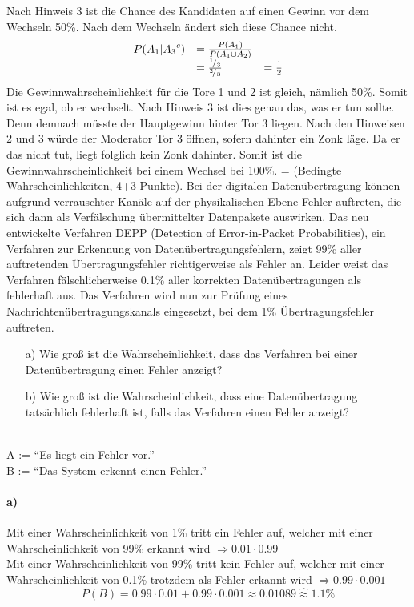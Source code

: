 \documentclass[twoside]{article}
\begin{document}
Nach Hinweis 3 ist die Chance des Kandidaten auf einen Gewinn vor dem Wechseln 50\%.
Nach dem Wechseln ändert sich diese Chance nicht.
\[
	\begin{array}{lll}
		P (A_1 | {A_3}^c)	&=	\frac{P(A_1)}{P(A_1\cup A_2)}	&\\
									&=	\frac{{}^{1}\!/_{3}}{{}^{2}\!/_{3}}	&= \frac{1}{2}
	\end{array}
\]
Die Gewinnwahrscheinlichkeit für die Tore 1 und 2 ist gleich, nämlich 50\%.
Somit ist es egal, ob er wechselt.
Nach Hinweis 3 ist dies genau das, was er tun sollte.
Denn demnach müsste der Hauptgewinn hinter Tor 3 liegen.
Nach den Hinweisen 2 und 3 würde der Moderator Tor 3 öffnen, sofern dahinter ein Zonk läge.
Da er das nicht tut, liegt folglich kein Zonk dahinter.
Somit ist die Gewinnwahrscheinlichkeit bei einem Wechsel bei 100\%.
\fi
\ifnum\ZettelAcht=\True
{}
\chead{}
\rhead{\memTwoName\\\memTwoNr}
(Bedingte Wahrscheinlichkeiten, 4+3 Punkte).
Bei der digitalen Datenübertragung können aufgrund verrauschter Kanäle auf der physikalischen Ebene Fehler auftreten, die sich dann als Verfälschung übermittelter Datenpakete auswirken.
Das neu entwickelte Verfahren DEPP (Detection of Error-in-Packet Probabilities), ein Verfahren zur Erkennung von
Datenübertragungsfehlern, zeigt 99\% aller auftretenden Übertragungsfehler richtigerweise als Fehler an.
Leider weist das Verfahren fälschlicherweise 0.1\% aller korrekten Datenübertragungen als fehlerhaft aus.
Das Verfahren wird nun zur Prüfung eines Nachrichtenübertragungskanals eingesetzt, bei dem 1\% Übertragungsfehler auftreten. 
\begin{enumerate}
	\item[a)] Wie groß ist die Wahrscheinlichkeit, dass das Verfahren bei einer Datenübertragung einen Fehler anzeigt?
	\item[b)] Wie groß ist die Wahrscheinlichkeit, dass eine Datenübertragung tatsächlich fehlerhaft ist, falls das Verfahren einen Fehler anzeigt?
\end{enumerate}
\vspace{.3cm}\-\\
A := ``Es liegt ein Fehler vor.''\\
B := ``Das System erkennt einen Fehler.''
\paragraph{a)}
Mit einer Wahrscheinlichkeit von 1\% tritt ein Fehler auf, welcher mit einer Wahrscheinlichkeit von 99\% erkannt wird $ \Rightarrow0.01\cdot 0.99$\\
Mit einer Wahrscheinlichkeit von 99\% tritt kein Fehler auf, welcher mit einer Wahrscheinlichkeit von 0.1\% trotzdem als Fehler erkannt wird $\Rightarrow0.99\cdot 0.001$
\[
	P(B)=0.99\cdot0.01+0.99\cdot0.001\approx0.01089\hat{\approx}1.1\%
\]
\end{document}
